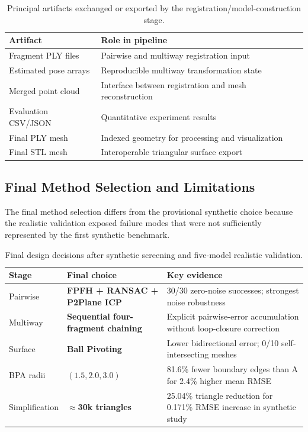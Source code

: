 \begin{table}[!t]
\centering
\footnotesize
\begin{tabularx}{\columnwidth}{@{}lY@{}}
\toprule
\textbf{Artifact} & \textbf{Role in pipeline} \\
\midrule
Fragment PLY files & Pairwise and multiway registration input \\
Estimated pose arrays & Reproducible multiway transformation state \\
Merged point cloud & Interface between registration and mesh reconstruction \\
Evaluation CSV/JSON & Quantitative experiment results \\
Final PLY mesh & Indexed geometry for processing and visualization \\
Final STL mesh & Interoperable triangular surface export \\
\bottomrule
\end{tabularx}
\caption{Principal artifacts exchanged or exported by the registration/model-construction stage.}
\label{tab:pipeline-artifacts}
\end{table}

\subsection{Final Method Selection and Limitations}
\label{sec:marvin-final-selection}

The final method selection differs from the provisional synthetic choice because the realistic validation exposed failure modes that were not sufficiently represented by the first synthetic benchmark.

\begin{table}[H]
\centering
\scriptsize
\setlength{\tabcolsep}{2.5pt}
\begin{tabularx}{\columnwidth}{@{}lYY@{}}
\toprule
\textbf{Stage} & \textbf{Final choice} & \textbf{Key evidence} \\
\midrule
Pairwise & \textbf{FPFH + RANSAC + P2Plane ICP} & 30/30 zero-noise successes; strongest noise robustness \\
Multiway & \textbf{Sequential four-fragment chaining} & Explicit pairwise-error accumulation without loop-closure correction \\
Surface & \textbf{Ball Pivoting} & Lower bidirectional error; 0/10 self-intersecting meshes \\
BPA radii & \textbf{$(1.5,2.0,3.0)$} & 81.6\% fewer boundary edges than A for 2.4\% higher mean RMSE \\
Simplification & \textbf{$\approx$30k triangles} & 25.04\% triangle reduction for 0.171\% RMSE increase in synthetic study \\
\bottomrule
\end{tabularx}
\caption{Final design decisions after synthetic screening and five-model realistic validation.}
\label{tab:final-selection}
\end{table}

